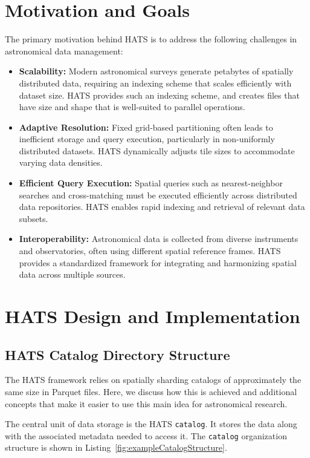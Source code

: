 \documentclass[11pt,a4paper]{ivoa}
\begin{document}
\section{Motivation and Goals}
The primary motivation behind HATS is to address the following challenges in astronomical data management:
\begin{itemize}
    \item \textbf{Scalability:} Modern astronomical surveys generate petabytes of spatially distributed data, requiring an indexing scheme that scales efficiently with dataset size.
    HATS provides such an indexing scheme, and creates files that have size and shape that is well-suited to parallel operations.
    \item \textbf{Adaptive Resolution:} Fixed grid-based partitioning often leads to inefficient storage and query execution, particularly in non-uniformly distributed datasets. 
    HATS dynamically adjusts tile sizes to accommodate varying data densities.
    \item \textbf{Efficient Query Execution:} Spatial queries such as nearest-neighbor searches and cross-matching must be executed efficiently across distributed data repositories. 
    HATS enables rapid indexing and retrieval of relevant data subsets.
    \item \textbf{Interoperability:} Astronomical data is collected from diverse instruments and observatories, often using different spatial reference frames. 
    HATS provides a standardized framework for integrating and harmonizing spatial data across multiple sources.
\end{itemize}

\section{HATS Design and Implementation}

\subsection{HATS Catalog Directory Structure} \label{sec:catalog}

The HATS framework relies on spatially sharding catalogs of approximately the same size in Parquet files. 
Here, we discuss how this is achieved and additional concepts that make it easier to use this main idea for astronomical research.

The central unit of data storage is the HATS \texttt{catalog}. 
It stores the data along with the associated metadata needed to access it. 
The  \texttt{catalog} organization structure is shown in Listing~\ref{fig:exampleCatalogStructure}.
\end{document}
